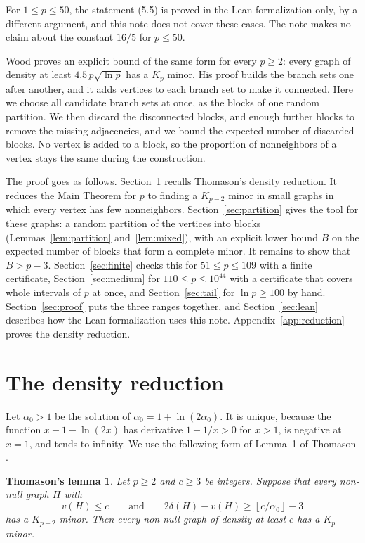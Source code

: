 \documentclass[11pt]{article}
\newtheorem*{thomasonlemma}{Thomason's lemma}
\newcommand{\floor}[1]{\left\lfloor#1\right\rfloor}
\begin{document}
For $1\le p\le50$, the statement (5.5) is proved in the Lean formalization
only, by a different argument, and this note does not cover these cases. The
note makes no claim about the constant $16/5$ for $p\le50$.

Wood \cite[Theorem~1]{wood} proves an explicit bound of the same form for
every $p\ge2$: every graph of density at least $4.5\,p\sqrt{\ln p}$ has a $K_p$
minor. His proof builds the branch sets one after another, and it adds
vertices to each branch set to make it connected. Here we choose all
candidate branch sets at once, as the blocks of one random partition. We
then discard the disconnected blocks, and enough further blocks to remove
the missing adjacencies, and we bound the expected number of discarded
blocks. No vertex is added to a block, so the proportion of nonneighbors of
a vertex stays the same during the construction.

The proof goes as follows. Section~\ref{sec:reduction} recalls Thomason's
density reduction. It reduces the Main Theorem for $p$ to finding a
$K_{p-2}$ minor in small graphs in which every vertex has few nonneighbors.
Section~\ref{sec:partition} gives the tool for these graphs: a random
partition of the vertices into blocks (Lemmas~\ref{lem:partition}
and~\ref{lem:mixed}), with an explicit lower bound $B$ on the expected
number of blocks that form a complete minor. It remains to show that
$B>p-3$. Section~\ref{sec:finite} checks this for $51\le p\le109$ with a
finite certificate, Section~\ref{sec:medium} for $110\le p\le10^{44}$ with a
certificate that covers whole intervals of $p$ at once, and
Section~\ref{sec:tail} for $\ln p\ge100$ by hand.
Section~\ref{sec:proof} puts the three ranges together, and
Section~\ref{sec:lean} describes how the Lean formalization uses this note.
Appendix~\ref{app:reduction} proves the density reduction.

\section{The density reduction}\label{sec:reduction}

Let $\alpha_0>1$ be the solution of $\alpha_0=1+\ln(2\alpha_0)$. It is
unique, because the function $x-1-\ln(2x)$ has derivative $1-1/x>0$ for
$x>1$, is negative at $x=1$, and tends to infinity. We use the following form
of Lemma~1 of Thomason \cite[page~262]{thomason}.

\begin{thomasonlemma}
Let $p\ge2$ and $c\ge3$ be integers. Suppose that every non-null graph $H$
with
\begin{equation}\label{eq:thomason}
 v(H)\le c\qquad\text{and}\qquad 2\delta(H)-v(H)\ge\floor{c/\alpha_0}-3
\end{equation}
has a $K_{p-2}$ minor. Then every non-null graph of density at least $c$ has
a $K_p$ minor.
\end{thomasonlemma}
\end{document}
